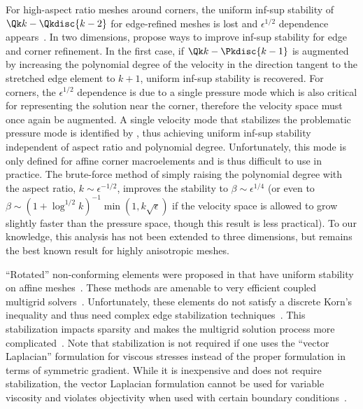 For high-aspect ratio meshes around corners, the uniform inf-sup stability of $\Qk k - \Qkdisc{k-2}$ for edge-refined meshes is lost and $\epsilon^{1/2}$ dependence appears~\cite{schotzau1998mhf}.
In two dimensions, \cite{ainsworth2000smh} propose ways to improve inf-sup stability for edge and corner refinement.
In the first case, if $\Qk k - \Pkdisc{k-1}$ is augmented by increasing the polynomial degree of the velocity in the direction tangent to the stretched edge element to $k+1$, uniform inf-sup stability is recovered.
For corners, the $\epsilon^{1/2}$ dependence is due to a single pressure mode which is also critical for representing the solution near the corner, therefore the velocity space must once again be augmented.
A single velocity mode that stabilizes the problematic pressure mode is identified by \cite{ainsworth2000smh}, thus achieving uniform inf-sup stability independent of aspect ratio and polynomial degree.
Unfortunately, this mode is only defined for affine corner macroelements and is thus difficult to use in practice.
The brute-force method of simply raising the polynomial degree with the aspect ratio, $k \sim \epsilon^{-1/2}$, improves the stability to $\beta \sim \epsilon^{1/4}$ (or even to $\beta \sim (1+\log^{1/2}k)^{-1} \min(1,k\sqrt\epsilon)$ if the velocity space is allowed to grow slightly faster than the pressure space, though this result is less practical).
To our knowledge, this analysis has not been extended to three dimensions, but remains the best known result for highly anisotropic meshes.

``Rotated'' non-conforming elements were proposed in \cite{rannacher1992simple} that have uniform stability on affine meshes~\cite{becker1994finite}.
These methods are amenable to very efficient coupled multigrid solvers~\cite{rannacher2000finite}.
Unfortunately, these elements do not satisfy a discrete Korn's inequality and thus need complex edge stabilization techniques~\cite{brenner2004korn,turek2007unified}.
This stabilization impacts sparsity and makes the multigrid solution process more complicated~\cite{turek2002multigrid,ouazzi2006efficient}.
Note that stabilization is not required if one uses the ``vector Laplacian'' formulation for viscous stresses instead of the proper formulation in terms of symmetric gradient.
While it is inexpensive and does not require stabilization, the vector Laplacian formulation cannot be used for variable viscosity and violates objectivity when used with certain boundary conditions~\cite{limache2008objectivity}.
